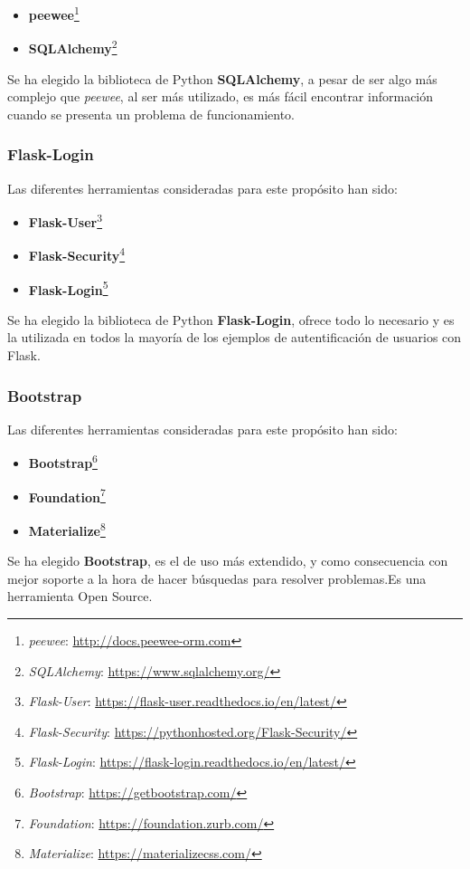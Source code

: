 \begin{itemize}
\item \textbf{peewee}\footnote{\textsl{peewee}: \url{http://docs.peewee-orm.com}}
\item \textbf{SQLAlchemy}\footnote{\textsl{SQLAlchemy}: \url{https://www.sqlalchemy.org/}}
\end{itemize}
Se ha elegido la biblioteca de Python \textbf{SQLAlchemy}, a pesar de ser algo más complejo que \emph{peewee}, al ser más utilizado, es más fácil encontrar información cuando se presenta un problema de funcionamiento.

\subsubsection{Flask-Login}
Las diferentes herramientas consideradas para este propósito han sido:

\begin{itemize}
\item \textbf{Flask-User}\footnote{\textsl{Flask-User}: \url{https://flask-user.readthedocs.io/en/latest/}}
\item \textbf{Flask-Security}\footnote{\textsl{Flask-Security}: \url{https://pythonhosted.org/Flask-Security/}}
\item \textbf{Flask-Login}\footnote{\textsl{Flask-Login}: \url{https://flask-login.readthedocs.io/en/latest/}}
\end{itemize}

Se ha elegido la biblioteca de Python \textbf{Flask-Login}, ofrece todo lo necesario y es la utilizada en todos la mayoría de los ejemplos de autentificación de usuarios con Flask.

\subsubsection{Bootstrap}
Las diferentes herramientas consideradas para este propósito han sido:

\begin{itemize}
\item \textbf{Bootstrap}\footnote{\textsl{Bootstrap}: \url{https://getbootstrap.com/}}
\item \textbf{Foundation}\footnote{\textsl{Foundation}: \url{https://foundation.zurb.com/}}
\item \textbf{Materialize}\footnote{\textsl{Materialize}: \url{https://materializecss.com/}}
\end{itemize}

Se ha elegido \textbf{Bootstrap}, es  el  de uso más extendido, y como consecuencia con mejor soporte a la hora de hacer búsquedas para resolver problemas.Es una herramienta Open Source.


